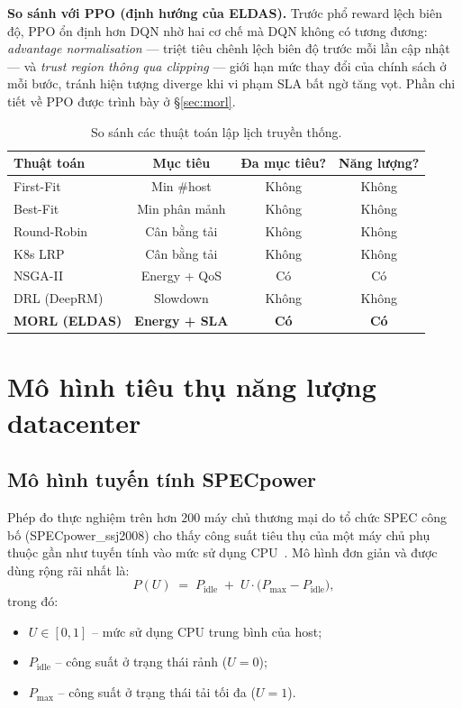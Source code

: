 \textbf{So sánh với PPO (định hướng của ELDAS).} Trước phổ reward lệch
biên độ, PPO ổn định hơn DQN nhờ hai cơ chế mà DQN không có tương
đương: \emph{advantage normalisation} --- triệt tiêu chênh lệch biên
độ trước mỗi lần cập nhật --- và \emph{trust region thông qua
clipping} --- giới hạn mức thay đổi của chính sách ở mỗi bước, tránh
hiện tượng diverge khi vi phạm SLA bất ngờ tăng vọt. Phần chi tiết về
PPO được trình bày ở §\ref{sec:morl}.

\begin{table}[H]
  \centering
  \caption{So sánh các thuật toán lập lịch truyền thống.}
  \label{tab:scheduling-comparison}
  \small
  \begin{tabular}{lccc}
    \toprule
    \textbf{Thuật toán} & \textbf{Mục tiêu} & \textbf{Đa mục tiêu?}
                       & \textbf{Năng lượng?} \\
    \midrule
    First-Fit            & Min \#host        & Không & Không \\
    Best-Fit             & Min phân mảnh     & Không & Không \\
    Round-Robin          & Cân bằng tải      & Không & Không \\
    K8s LRP              & Cân bằng tải      & Không & Không \\
    NSGA-II              & Energy + QoS      & Có    & Có    \\
    DRL (DeepRM)         & Slowdown          & Không & Không \\
    \textbf{MORL (ELDAS)}& \textbf{Energy + SLA} & \textbf{Có} & \textbf{Có} \\
    \bottomrule
  \end{tabular}
\end{table}

\section{Mô hình tiêu thụ năng lượng datacenter}
\label{sec:nang-luong}

\subsection{Mô hình tuyến tính SPECpower}
Phép đo thực nghiệm trên hơn $200$ máy chủ thương mại do tổ chức SPEC công bố
(SPECpower\_ssj2008) cho thấy công suất tiêu thụ của một máy chủ phụ thuộc
gần như tuyến tính vào mức sử dụng CPU~\cite{beloglazov2012energy}. Mô hình
đơn giản và được dùng rộng rãi nhất là:
\begin{equation}
  P(U) \;=\; P_{\mathrm{idle}} \;+\; U \cdot \big(P_{\mathrm{max}} -
                                                  P_{\mathrm{idle}}\big),
  \label{eq:linear-power}
\end{equation}
trong đó:
\begin{itemize}
  \item $U \in [0,1]$ -- mức sử dụng CPU trung bình của host;
  \item $P_{\mathrm{idle}}$ -- công suất ở trạng thái rảnh ($U=0$);
  \item $P_{\mathrm{max}}$ -- công suất ở trạng thái tải tối đa ($U=1$).
\end{itemize}


